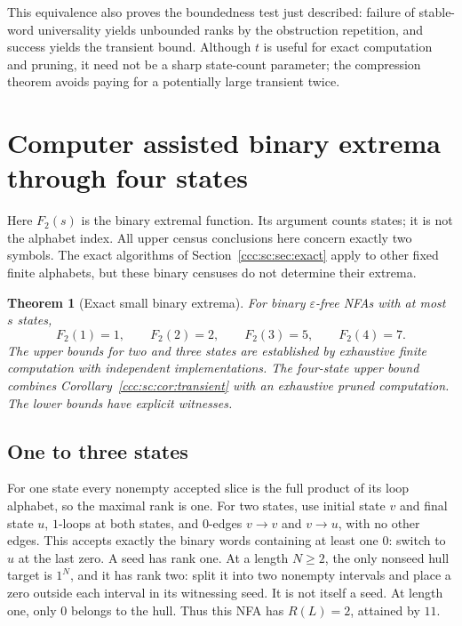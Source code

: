 \documentclass[11pt,letterpaper]{article}
\newtheorem{theorem}{Theorem}[section]
\theoremstyle{definition}
\theoremstyle{remark}
\begin{document}
This equivalence also proves the boundedness test just described: failure of stable-word universality yields unbounded ranks by the obstruction repetition, and success yields the transient bound. Although $t$ is useful for exact computation and pruning, it need not be a sharp state-count parameter; the compression theorem avoids paying for a potentially large transient twice.

\section{Computer assisted binary extrema through four states}\label{ccc:sc:sec:census}

Here $F_2(s)$ is the binary extremal function. Its argument counts states; it is not the alphabet index. All upper census conclusions here concern exactly two symbols. The exact algorithms of Section~\ref{ccc:sc:sec:exact} apply to other fixed finite alphabets, but these binary censuses do not determine their extrema.

\begin{theorem}[Exact small binary extrema]\label{ccc:sc:thm:small}
For binary $\varepsilon$-free NFAs with at most $s$ states,
\[
 \boxed{F_2(1)=1,\qquad F_2(2)=2,\qquad F_2(3)=5,\qquad F_2(4)=7.}
\]
The upper bounds for two and three states are established by exhaustive finite computation with independent implementations. The four-state upper bound combines Corollary~\ref{ccc:sc:cor:transient} with an exhaustive pruned computation. The lower bounds have explicit witnesses.
\end{theorem}

\subsection{One to three states}

For one state every nonempty accepted slice is the full product of its loop alphabet, so the maximal rank is one. For two states, use initial state $v$ and final state $u$, $1$-loops at both states, and $0$-edges $v\to v$ and $v\to u$, with no other edges. This accepts exactly the binary words containing at least one $0$: switch to $u$ at the last zero. A seed has rank one. At a length $N\ge2$, the only nonseed hull target is $1^N$, and it has rank two: split it into two nonempty intervals and place a zero outside each interval in its witnessing seed. It is not itself a seed. At length one, only $0$ belongs to the hull. Thus this NFA has $R(L)=2$, attained by $11$.
\end{document}
